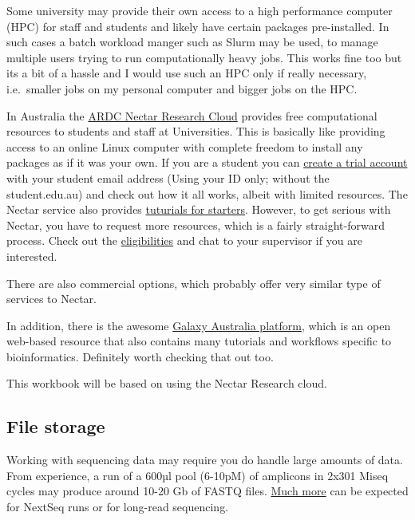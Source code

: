 \documentclass[
]{book}
\begin{document}
Some university may provide their own access to a high performance computer (HPC) for staff and students and likely have certain packages pre-installed. In such cases a batch workload manger such as Slurm may be used, to manage multiple users trying to run computationally heavy jobs. This works fine too but its a bit of a hassle and I would use such an HPC only if really necessary, i.e.~smaller jobs on my personal computer and bigger jobs on the HPC.

In Australia the \href{https://ardc.edu.au/services/nectar-research-cloud/}{ARDC Nectar Research Cloud} provides free computational resources to students and staff at Universities. This is basically like providing access to an online Linux computer with complete freedom to install any packages as if it was your own. If you are a student you can \href{https://dashboard.rc.nectar.org.au/}{create a trial account} with your student email address (Using your ID only; without the student.edu.au) and check out how it all works, albeit with limited resources. The Nectar service also provides \href{https://tutorials.rc.nectar.org.au/}{tuturials for starters}. However, to get serious with Nectar, you have to request more resources, which is a fairly straight-forward process. Check out the \href{https://support.ehelp.edu.au/support/solutions/articles/6000068044-managing-an-allocation}{eligibilities} and chat to your supervisor if you are interested.

There are also commercial options, which probably offer very similar type of services to Nectar.

In addition, there is the awesome \href{https://usegalaxy.org.au/}{Galaxy Australia platform}, which is an open web-based resource that also contains many tutorials and workflows specific to bioinformatics. Definitely worth checking that out too.

This workbook will be based on using the Nectar Research cloud.

\hypertarget{file-storage}{%
\subsection{File storage}\label{file-storage}}

Working with sequencing data may require you do handle large amounts of data. From experience, a run of a 600µl pool (6-10pM) of amplicons in 2x301 Miseq cycles may produce around 10-20 Gb of FASTQ files. \href{https://sapac.support.illumina.com/bulletins/2018/01/approximate-sizes-of-sequencing-run-output-folders.html}{Much more} can be expected for NextSeq runs or for long-read sequencing.
\end{document}
